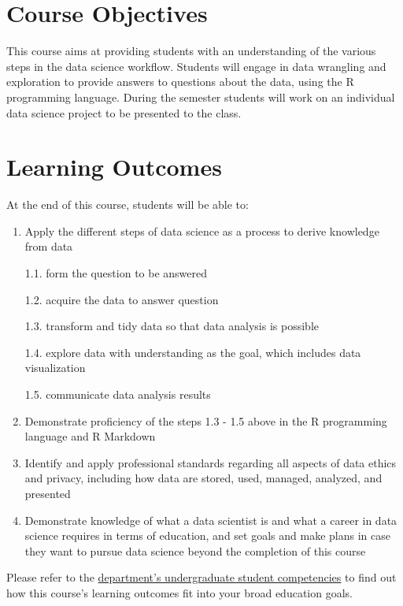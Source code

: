 \documentclass[
]{book}
\begin{document}
\hypertarget{course-objectives}{%
\section{Course Objectives}\label{course-objectives}}

This course aims at providing students with an understanding of the various steps in the data science workflow. Students will engage in data wrangling and exploration to provide answers to questions about the data, using the R programming language. During the semester students will work on an individual data science project to be presented to the class.

\hypertarget{learning-outcomes}{%
\section{Learning Outcomes}\label{learning-outcomes}}

At the end of this course, students will be able to:

\begin{enumerate}
\def\labelenumi{\arabic{enumi}.}
\item
  Apply the different steps of data science as a process to derive knowledge from data

  1.1. form the question to be answered

  1.2. acquire the data to answer question

  1.3. transform and tidy data so that data analysis is possible

  1.4. explore data with understanding as the goal, which includes data visualization

  1.5. communicate data analysis results
\item
  Demonstrate proficiency of the steps 1.3 - 1.5 above in the R programming language and R Markdown
\item
  Identify and apply professional standards regarding all aspects of data ethics and privacy, including how data are stored, used, managed, analyzed, and presented
\item
  Demonstrate knowledge of what a data scientist is and what a career in data science requires in terms of education, and set goals and make plans in case they want to pursue data science beyond the completion of this course
\end{enumerate}

Please refer to the \href{https://ischool.arizona.edu/undergraduate-student-competencies}{department's undergraduate student competencies} to find out how this course's learning outcomes fit into your broad education goals.
\end{document}
